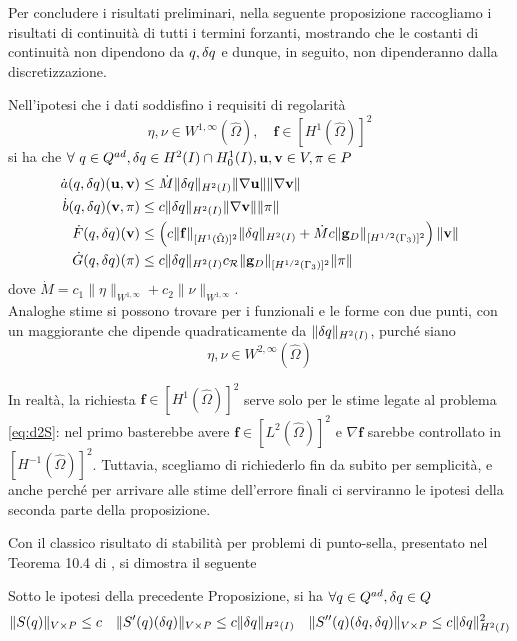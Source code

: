 Per concludere i risultati preliminari, nella seguente proposizione raccogliamo i risultati di continuità di tutti i termini forzanti, mostrando che le costanti di continuità non dipendono da $q,{\delta q}$ e dunque, in seguito, non dipenderanno dalla discretizzazione.
\begin{prop}
	Nell'ipotesi che i dati soddisfino i requisiti di regolarità 
	$$\eta,\nu\in W^{1,\infty}(\hat{\Omega}),\quad \mathbf f\in [H^1(\hat{\Omega})]^2$$
	si ha che $\forall\ q\in Q^{ad},{\delta q}\in H^2(I)\cap H^1_0(I),\mathbf{u},\mathbf{v}\in V,\pi\in P$
	\begin{subequations}\begin{align}
	\dot{a}(q,{\delta q})(\mathbf{u},\mathbf{v})&\leq \dot{M}\|{\delta q}\|_{H^2(I)}\|\nabla\mathbf{u}\|\|\nabla\mathbf{v}\|\\
	\dot{b}(q,{\delta q})(\mathbf{v},\pi)&\leq c\|{\delta q}\|_{H^2(I)}\|\nabla\mathbf{v}\|\|\pi\|\\
	\dot{F}(q,{\delta q})(\mathbf{v})&\leq \left(c\|\mathbf f\|_{[H^1(\hat{\Omega})]^2}\|{\delta q}\|_{H^2(I)}+\dot{M}c\|\mathbf g_D\|_{[H^{1/2}(\Gamma_3)]^2}\right)\|\mathbf{v}\|\\
	\dot{G}(q,{\delta q})(\pi) &\leq c\|{\delta q}\|_{H^2(I)}c_{\mathcal{R}}\|\mathbf g_D\|_{[H^{1/2}(\Gamma_3)]^2}\|\pi\|
	\end{align}\end{subequations}
	dove $\dot{M} = c_1\|\eta\|_{W^{1,\infty}}+c_2\|\nu\|_{W^{1,\infty}}$.\\
	Analoghe stime si possono trovare per i funzionali e le forme con due punti, con un maggiorante che dipende quadraticamente da $\|{\delta q}\|_{H^2(I)}$, purché siano
	$$\eta,\nu\in W^{2,\infty}(\hat{\Omega})$$
\label{th:dotcont}
\end{prop}
\begin{oss}
	In realtà, la richiesta $\mathbf f\in [H^1(\hat{\Omega})]^2$ serve solo per le stime legate al problema \eqref{eq:d2S}: nel primo basterebbe avere $\mathbf f\in [L^2(\hat{\Omega})]^2$ e $\nabla\mathbf f$ sarebbe controllato in $[H^{-1}(\hat{\Omega})]^2$. Tuttavia, scegliamo di richiederlo fin da subito per semplicità, e anche perché per arrivare alle stime dell'errore finali ci serviranno le ipotesi della seconda parte della proposizione.
\end{oss}
Con il classico risultato di stabilità per problemi di punto-sella, presentato nel Teorema 10.4 di \cite{Quarteroni2008}, si dimostra il seguente
\begin{cor}
	Sotto le ipotesi della precedente Proposizione, si ha $\forall q\in Q^{ad},{\delta q}\in Q$
	$$\|S(q)\|_{V\times P}\leq c\quad\|S'(q)({\delta q})\|_{V\times P}\leq c\|{\delta q}\|_{H^2(I)}\quad\|S''(q)({\delta q},{\delta q})\|_{V\times P}\leq c\|{\delta q}\|_{H^2(I)}^2$$
\label{th:SLim}
\end{cor}

